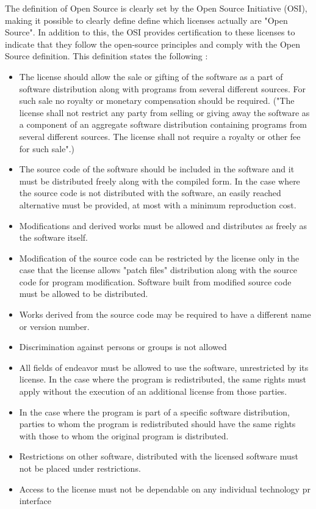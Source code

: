 The definition of Open Source is clearly set by the Open Source Initiative (OSI), making it possible to clearly define define which licenses actually are "Open Source". In addition to this, the OSI provides certification to these licenses to indicate that they follow the open-source principles and comply with the Open Source definition. This definition states the following \citep{osbook}:
\begin{itemize}

\item The license should allow the sale or gifting of the software as a part of software distribution along with programs from several different sources. For such sale no royalty or monetary compensation should be required. ("The license shall not restrict any party from selling or giving away the software as a component of an aggregate software distribution containing programs from several different sources. The license shall not require a royalty or other fee for such sale".)
\item The source code of the software should be included in the software and it must be distributed freely along with the compiled form. In the case where the source code is not distributed with the software, an easily reached alternative must be provided, at most with a minimum reproduction cost.
\item Modifications and derived works must be allowed and distributes as freely as the software itself.
\item Modification of the source code can be restricted by the license only in the case that the license allows "patch files" distribution along with the source code for program modification. Software built from modified source code must be allowed to be distributed. \item Works derived from the source code may be required to have a different name or version number.
\item Discrimination against persons or groups is not allowed
\item All fields of endeavor must be allowed to use the software, unrestricted by its license.
In the case where the program is redistributed, the same rights must apply without the execution of an additional license from those parties.
\item In the case where the program is part of a specific software distribution, parties to whom the program is redistributed should have the same rights with those to  whom the original program is distributed.
\item Restrictions on other software, distributed with the licensed software must not be placed under restrictions.
\item Access to the license must not be dependable on any individual technology pr interface
\end{itemize}

